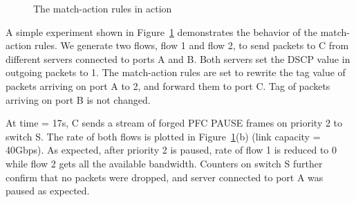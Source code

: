 \begin{figure}[t]
	\centering
	
	
	\caption{The match-action rules in action}\label{fig:tagger_demon}
\end{figure}


  A simple experiment shown in
Figure~\ref{fig:tagger_demon} demonstrates the behavior of the match-action
rules.  We generate two flows, flow 1 and flow 2, to send packets to C from
different servers connected to ports A and B. Both servers set the DSCP value in
outgoing packets to 1. The match-action rules are set to rewrite the tag value
of packets arriving on port A to 2, and forward them to port C. Tag of packets
arriving on port B is not changed.
 
At time = 17s, C sends a stream of forged PFC PAUSE frames on priority 2 to
switch S. The rate of both flows is plotted in Figure~\ref{fig:tagger_demon}(b)
(link capacity = 40Gbps). As expected, after priority 2 is paused, rate of
flow 1 is reduced to 0 while flow 2 gets all the available bandwidth. 
Counters on switch S further confirm that no packets were dropped, and server
connected to port A was paused as expected.
